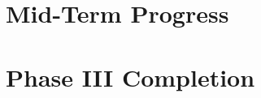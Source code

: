 \documentclass[12pt,a4paper]{report}
\begin{document}


\clearpage
\tableofcontents
\clearpage

\setcounter{page}{1}

\part{Mid-Term Progress}


\part{Phase III Completion}


\appendix

\end{document}
